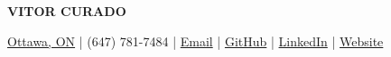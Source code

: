 \begin{center}
    {\LARGE\bfseries VITOR CURADO}

    \vspace{3pt}

    \href{https://www.google.com/maps/place/Ottawa,+ON/}{Ottawa, ON} \enspace|\enspace
    (647) 781-7484 \enspace|\enspace
    \href{mailto:vitorbmcurado@proton.me}{Email} \enspace|\enspace
    \href{https://github.com/Vitor-Curado}{GitHub} \enspace|\enspace
    \href{https://www.linkedin.com/in/vitor-curado/}{LinkedIn} \enspace|\enspace
    \href{https://buildhaven.cc/}{Website}
\end{center}